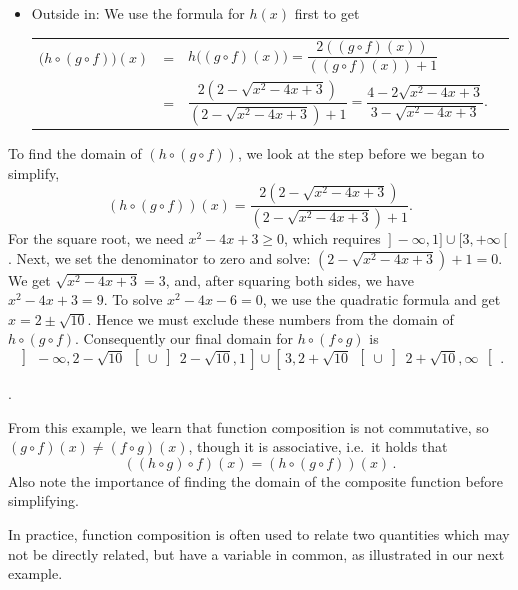 \begin{example}
\begin{enumerate}
\begin{itemize}
\item  Outside in:  We use the formula for $h(x)$ first to get

\begin{tabular}{rclr} $\big(h \circ (g \circ f)\big)(x)$ & = & $h\big((g \circ f)(x)\big)=\dfrac{2 \left( (g \circ f)(x)\right)}{  \left( (g \circ f)(x)\right) + 1}$  & \\ [0.8cm]
& = & $\dfrac{2 \left(2 - \sqrt{x^2-4x+3}\right)}{\left(2 - \sqrt{x^2-4x+3}\right)+1}=\dfrac{4 - 2\sqrt{x^2-4x+3}}{3 - \sqrt{x^2-4x+3}}$. & \\ 
 \end{tabular}
 
 \end{itemize}
 
To find the domain of $(h \circ (g \circ f))$, we look at the step before we began to simplify, 
\[(h \circ (g \circ f))(x) = \frac{2 \left(2 - \sqrt{x^2-4x+3}\right)}{\left(2 - \sqrt{x^2-4x+3}\right)+1}.\] 
 For the square root, we need $x^2-4x+3 \geq 0$, which requires $\left.\right]-\infty, 1] \cup [3,+\infty\left[\right.$.  Next, we set the denominator to zero and solve:  $\left(2 - \sqrt{x^2-4x+3}\right)+1 = 0$.  We get $\sqrt{x^2-4x+3} = 3$, and, after squaring both sides, we have $x^2-4x+3 = 9$.  To solve $x^2-4x-6 = 0$, we use the quadratic formula and get $x = 2 \pm \sqrt{10}$.   Hence we must exclude these numbers from the domain of $h \circ (g \circ f)$.  Consequently our final domain for $h \circ (f \circ g)$ is $$\left]\,-\infty, 2 -\sqrt{10}\,\right[ \cup \left]\, 2 - \sqrt{10}, 1\,\right] \cup \left[\, 3, 2 + \sqrt{10}\, \right[ \cup \left]\,2+\sqrt{10}, \infty\,\right[\,.$$

.

\end{enumerate}
\end{example}




From this example, we learn that  function composition is not commutative, so $\left(g \circ f\right)(x)\neq \left(f \circ g\right)(x)$, though it is associative, i.e.\ it holds that
$$
\left(\left(h \circ g\right) \circ f\right)(x)=\left(h \circ \left(g \circ f\right)\right)(x)\,.
$$
Also note the importance of finding the domain of the composite function before simplifying.


\ifvc

In practice, function composition is often used to relate two quantities which may not be directly related, but have a variable in common, as illustrated in our next example.

